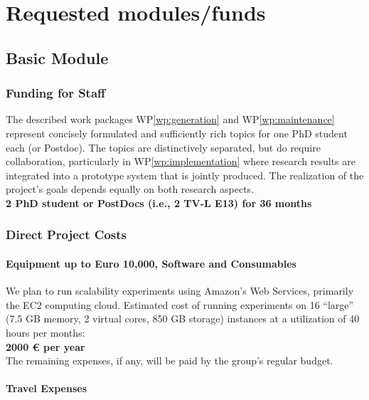 \newpage
\section{Requested modules/funds}


\subsection{Basic Module}

	\subsubsection{Funding for Staff}

		The described work packages WP\ref{wp:generation} and WP\ref{wp:maintenance} represent concisely formulated and sufficiently rich topics for one PhD student each (or Postdoc). 
		The topics are distinctively separated, but do require collaboration, particularly in WP\ref{wp:implementation} where research results are integrated into a prototype system
		that is jointly produced. The realization of the project's goals depends equally on both research aspects.\\

		{\bf 2 PhD student or PostDocs (i.e., 2 TV-L E13) for 36 months}
		

	\subsubsection{Direct Project Costs}

		\paragraph{Equipment up to Euro 10,000, Software and Consumables}$\,$\medskip\\

			We plan to run scalability experiments using Amazon's Web Services, primarily the EC2 computing cloud.
			Estimated cost of running experiments on 16 ``large'' (7.5 GB memory, 2 virtual cores, 850 GB storage) 
			instances at a utilization of 40 hours per months:\\

			{\bf	2000 \euro\xspace per year}\\

			\noindent The remaining expenses, if any, will be paid by the group's regular budget.			

		\paragraph{Travel Expenses}$\,$\medskip\\

